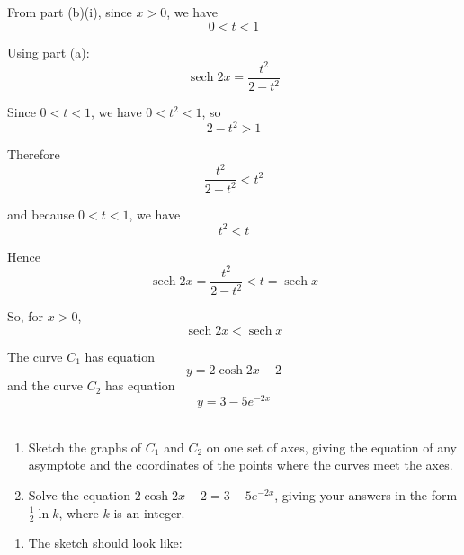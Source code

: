 \documentclass[leqno]{article}
\begin{document}
\begin{enumerate}[
  label=\textbf{\arabic*.},
  leftmargin=*,
  topsep=0pt,
  partopsep=0pt,
  parsep=0pt
]
\begin{djsSolution}
\begin{enumerate}[label=\textbf{(\alph*)}]
\begin{enumerate}[label=(\roman*)]
    From part (b)(i), since \(x>0\), we have
    \[
    0<t<1
    \]

    Using part (a):
    \[
    \operatorname{sech} 2x=\frac{t^2}{2-t^2}
    \]

    Since \(0<t<1\), we have \(0<t^2<1\), so
    \[
    2-t^2>1
    \]

    Therefore
    \[
    \frac{t^2}{2-t^2}<t^2
    \]

    and because \(0<t<1\), we have
    \[
    t^2<t
    \]

    Hence
    \[
    \operatorname{sech} 2x=\frac{t^2}{2-t^2}<t=\operatorname{sech} x
    \]

    So, for \(x>0\),
    \[
    \operatorname{sech} 2x<\operatorname{sech} x
    \]
  \end{enumerate}
\end{enumerate}
\end{djsSolution}


\newpage

\questionitem

The curve $C_1$ has equation \[y=2\cosh 2x-2\] and the curve $C_2$ has equation \[y=3-5e^{-2x}\] \\
\begin{enumerate}[label=\textbf{(\alph*)}]
  \item Sketch the graphs of $C_1$ and $C_2$ on one set of axes, giving the equation of any asymptote and the coordinates of the points where the curves meet the axes.  \\
  \item Solve the equation $2\cosh 2x-2=3-5e^{-2x}$, giving your answers in the form $\frac{1}{2}\ln k$, where $k$ is an integer.  \\
\end{enumerate}

\vspace*{10pt}

\begin{djsSolution}
\begin{enumerate}[label=\textbf{(\alph*)}]
  \item The sketch should look like:\par\nopagebreak


\end{enumerate}
\end{djsSolution}
\end{enumerate}
\end{document}
